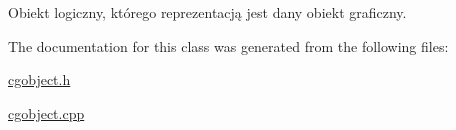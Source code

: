 Obiekt logiczny, którego reprezentacją jest dany obiekt graficzny. 



The documentation for this class was generated from the following files\+:\begin{DoxyCompactItemize}
\item 
\mbox{\hyperlink{cgobject_8h}{cgobject.\+h}}\item 
\mbox{\hyperlink{cgobject_8cpp}{cgobject.\+cpp}}\end{DoxyCompactItemize}
